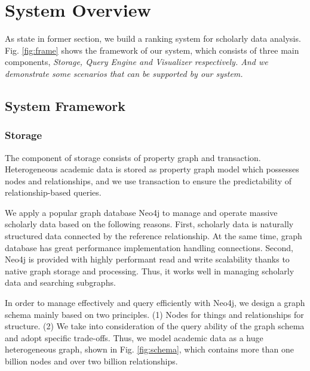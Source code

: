 \section{System Overview}
\label{sec-system}

As state in former section, we build a ranking system for scholarly data analysis. Fig. \ref{fig:frame} shows the framework of our system, which consists of three main components, \itshape Storage, Query Engine \upshape and \itshape Visualizer \upshape respectively. And we demonstrate some scenarios that can be supported by our system.

\subsection{System Framework}

\subsubsection{Storage}
\par
The component of storage consists of property graph and transaction. Heterogeneous academic data is stored as property graph model which possesses nodes and relationships, and we use transaction to ensure the predictability of relationship-based queries.

\par
We apply a popular graph database Neo4j \cite{Neo4j} to manage and operate massive scholarly data based on the following reasons. First, scholarly data is naturally structured data connected by the reference relationship. At the same time, graph database has great performance implementation handling connections. Second, Neo4j is provided with highly performant read and write scalability thanks to native graph storage and processing. Thus, it works well in managing scholarly data and searching subgraphs.

\par
In order to manage effectively and query efficiently with Neo4j, we design a graph schema mainly based on two principles. (1) Nodes for things and relationships for structure. (2) We take into consideration of the query ability of the graph schema and adopt specific trade-offs. Thus, we model academic data as a huge heterogeneous graph, shown in Fig. \ref{fig:schema}, which contains more than one billion nodes and over two billion relationships.

